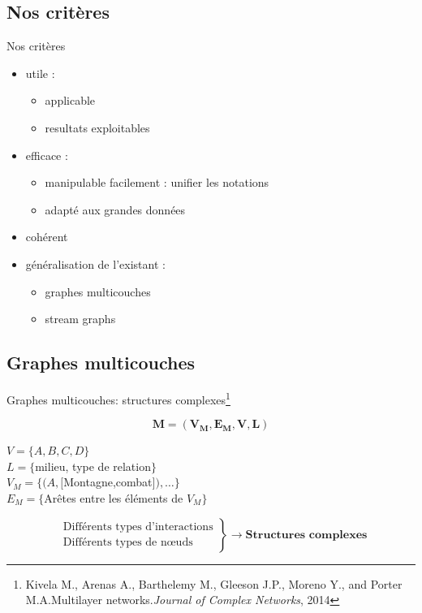 \documentclass[15pt]{beamer}
\def \stgs {stream graphs}
\begin{document}
\subsection{Nos critères}
\begin{frame}{Nos critères}
	\begin{itemize}
		\item utile : \begin{itemize}
							\item applicable
							\item resultats exploitables
						\end{itemize}		 \pause
		\item efficace : \begin{itemize}
							\item manipulable \og facilement \fg{} : unifier les notations
							\item adapté aux grandes données
						\end{itemize}\pause
		\item cohérent \pause
		\item généralisation de l'existant : 
			\begin{itemize}
				\item graphes multicouches
				\item \stgs{}
			\end{itemize}
	\end{itemize}
\end{frame}

\subsection{Graphes multicouches}
\begin{frame}{Graphes multicouches: structures complexes\footnote{Kivela M., Arenas A., Barthelemy M., Gleeson J.P., Moreno Y., and Porter M.A.Multilayer networks.\textit{Journal of Complex Networks}, 2014}}

\begin{minipage}{0.4\textwidth}
	$$\mathbf{M=(V_M,E_M,V,L)}$$
\begin{footnotesize}
$V = \{A,B,C,D\}$\\
$L = \{$milieu, type de relation$\}$\\
$V_M = \{(A,[$Montagne,combat$]), \dots \}$\\
$E_M = \{$Arêtes entre les éléments de $V_M \}$
\end{footnotesize}
\end{minipage}
\begin{minipage}[r]{0.59\textwidth}
\begin{figure}
    \flushright
    
\end{figure}
\end{minipage}
$$
\left.
\begin{array}{l}
    \text{ Différents types d'interactions}\\
    \text{ Différents types de n\oe{}uds}
\end{array}
\right \}\rightarrow \textbf{Structures complexes}
$$

\end{frame}
\end{document}
